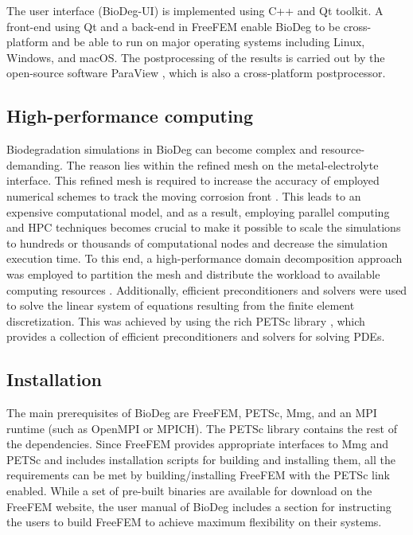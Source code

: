 The user interface (BioDeg-UI) is implemented using C++ and Qt toolkit. A front-end using Qt and a back-end in FreeFEM enable BioDeg to be cross-platform and be able to run on major operating systems including Linux, Windows, and macOS. The postprocessing of the results is carried out by the open-source software ParaView \cite{Ahrens2005}, which is also a cross-platform postprocessor.

\subsection{High-performance computing}

Biodegradation simulations in BioDeg can become complex and resource-demanding. The reason lies within the refined mesh on the metal-electrolyte interface. This refined mesh is required to increase the accuracy of employed numerical schemes to track the moving corrosion front \cite{Barzegari2021, Barzegari2022}. This leads to an expensive computational model, and as a result, employing parallel computing and {HPC} techniques becomes crucial to make it possible to scale the simulations to hundreds or thousands of computational nodes and decrease the simulation execution time. To this end, a high-performance domain decomposition approach was employed to partition the mesh and distribute the workload to available computing resources \cite{Dolean2015}. Additionally, efficient preconditioners and solvers were used to solve the linear system of equations resulting from the finite element discretization. This was achieved by using the rich {PETSc} library \cite{petsc}, which provides a collection of efficient preconditioners and solvers for solving {PDE}s.

\subsection{Installation}

The main prerequisites of BioDeg are FreeFEM, {PETSc}, Mmg, and an {MPI} runtime (such as OpenMPI or MPICH). The {PETSc} library contains the rest of the dependencies. Since FreeFEM provides appropriate interfaces to Mmg and {PETSc} and includes installation scripts for building and installing them, all the requirements can be met by building/installing FreeFEM with the {PETSc} link enabled. While a set of pre-built binaries are available for download on the FreeFEM website, the user manual of BioDeg includes a section for instructing the users to build FreeFEM to achieve maximum flexibility on their systems.

